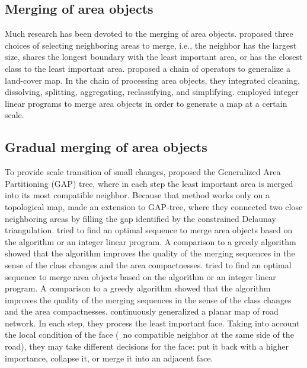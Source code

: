 \documentclass[]{interact}
\begin{document}



\subsection{Merging of area objects}
Much research has been devoted to the merging of area objects.
\citet{Cheng2006} proposed three choices of 
selecting neighboring areas to merge, i.e.,
the neighbor has the largest size, 
shares the longest boundary with the least important area,
or has the closest class to the least important area.
\citet{Thiemann2018LandCover} proposed a chain of operators 
to generalize a land-cover map.
In the chain of processing area objects, 
they integrated cleaning, dissolving, splitting, 
aggregating, reclassifying, and simplifying.
\citet{HaunertWolff2010AreaAgg,Oehrlein2017Aggregation} 
employed integer linear programs to merge area objects
in order to generate a map at a certain scale.



\subsection{Gradual merging of area objects}
\label{sec:gradual_merge}

To provide scale transition of small changes, 
\citet{vanOosterom1995GAPTree} proposed 
the Generalized Area Partitioning (GAP) tree,
where in each step the least important area is merged into
its most compatible neighbor.
Because that method works only on a topological map,
\citet{Ai2002GAP} made an extension to GAP-tree,
where they connected two close neighboring areas 
by filling the gap identified by the constrained Delaunay triangulation.
\citet{Peng2020AreaAgg} tried to 
find an optimal sequence to merge area objects 
based on the \Astar algorithm or an integer linear program.
A comparison to a greedy algorithm showed that 
the \Astar algorithm improves the quality of the merging sequences
in the sense of the class changes and the area compactnesses.
\citet{Peng2020AreaAgg} tried to 
find an optimal sequence to merge area objects 
based on the \Astar algorithm or an integer linear program.
A comparison to a greedy algorithm showed that 
the \Astar algorithm improves the quality of the merging sequences
in the sense of the class changes and the area compactnesses.
\citet{Suba2016Road} continuously generalized a planar map of road network.
In each step, they process the least important face.
Taking into account the local condition of the face
(\eg~no compatible neighbor at the same side of the road),
they may take different decisions for the face: 
put it back with a higher importance, collapse it, 
or merge it into an adjacent face.
\end{document}
